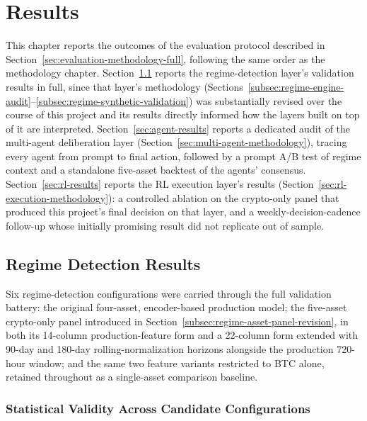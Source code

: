 \chapter{Results}
\label{chap:results}

This chapter reports the outcomes of the evaluation protocol described in Section~\ref{sec:evaluation-methodology-full}, following the same order as the methodology chapter. Section~\ref{sec:regime-results} reports the regime-detection layer's validation results in full, since that layer's methodology (Sections~\ref{subsec:regime-engine-audit}--\ref{subsec:regime-synthetic-validation}) was substantially revised over the course of this project and its results directly informed how the layers built on top of it are interpreted. Section~\ref{sec:agent-results} reports a dedicated audit of the multi-agent deliberation layer (Section~\ref{sec:multi-agent-methodology}), tracing every agent from prompt to final action, followed by a prompt A/B test of regime context and a standalone five-asset backtest of the agents' consensus. Section~\ref{sec:rl-results} reports the RL execution layer's results (Section~\ref{sec:rl-execution-methodology}): a controlled ablation on the crypto-only panel that produced this project's final decision on that layer, and a weekly-decision-cadence follow-up whose initially promising result did not replicate out of sample.

\section{Regime Detection Results}
\label{sec:regime-results}

Six regime-detection configurations were carried through the full validation battery: the original four-asset, encoder-based production model; the five-asset crypto-only panel introduced in Section~\ref{subsec:regime-asset-panel-revision}, in both its 14-column production-feature form and a 22-column form extended with 90-day and 180-day rolling-normalization horizons alongside the production 720-hour window; and the same two feature variants restricted to BTC alone, retained throughout as a single-asset comparison baseline.

\subsection{Statistical Validity Across Candidate Configurations}
\label{subsec:regime-results-preview}

